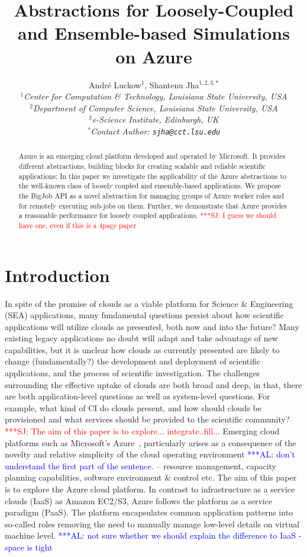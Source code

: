 \documentclass[conference,final]{IEEEtran}
\title{Abstractions for Loosely-Coupled and Ensemble-based Simulations
  on Azure\up}
\author{
Andr\'e Luckow$^{1}$, Shantenu Jha$^{1,2,3,*}$\\
  \small{\emph{$^{1}$Center for Computation \& Technology, Louisiana State University, USA}}\\
  \small{\emph{$^{2}$Department of Computer Science, Louisiana State University, USA}}\\
  \small{\emph{$^{3}$e-Science Institute, Edinburgh, UK}}\\
  \small{\emph{$^{*}$Contact Author: \texttt{sjha@cct.lsu.edu}}}\\
  \up\up\up\up
}
\newcommand{\up}{\vspace*{-1em}}
\newcommand{\alnote}[1]{ {\textcolor{blue} { ***AL: #1 }}}
\newcommand{\jhanote}[1]{ {\textcolor{red} { ***SJ: #1 }}}
\newcommand{\alnote}[1]{}
\newcommand{\jhanote}[1]{}
\begin{document}
 

\maketitle    

\begin{abstract}
Azure is an emerging cloud platform developed and operated by Microsoft. 
It provides different abstractions, building blocks for creating 
scalable and reliable scientific applications;    
In this paper we investigate the applicability of the Azure  abstractions
to the well-known class of loosely coupled and ensemble-based applications.
We propose the BigJob API as a novel abstraction for managing groups
of Azure worker roles and for remotely executing sub-jobs on them. Further,
we demonstrate that Azure provides a reasonable performance for 
loosely coupled applications.
\jhanote{I guess we should have one, even if this is a 4page paper}
\up
\up\up
\end{abstract}

\section{Introduction}
\up
In spite of the promise of clouds as a viable platform for Science \&
Engineering (SEA) applications, many fundamental questions persist about how
scientific applications will utilize clouds as presented, both now and
into the future? Many existing legacy applications no doubt will adapt
and take advantage of new capabilities, but it is unclear how clouds
as currently presented are likely to change (fundamentally?)  the
development and deployment of scientific applications, and the process
of scientific investigation. The challenges surrounding the effective
uptake of clouds are both broad and deep, in that, there are both
application-level questions as well as system-level questions. For
example, what kind of CI do clouds present, and how should clouds be
provisioned and what services should be provided to the scientific
community? \jhanote{The aim of this paper is to
explore... integrate..fill...} Emerging cloud platforms such
as Microsoft's Azure~\cite{winazure}, particularly arises as a consequence of the novelty and
relative simplicity of the cloud operating environment \alnote{don't
understand the first part of the sentence.}– resource
management, capacity planning capabilities, software environment \&
control etc. The aim of this paper is to explore 
the Azure cloud platform. In contrast to infrastructure as a service clouds (IaaS)
as Amazon EC2/S3, Azure follows the platform as a service paradigm (PaaS). 
The platform encapsulates common application patterns into so-called roles
removing the need to manually manage low-level details
on virtual machine level.
\alnote{not sure whether we should explain the difference to IaaS - space
is tight}
\end{document}
